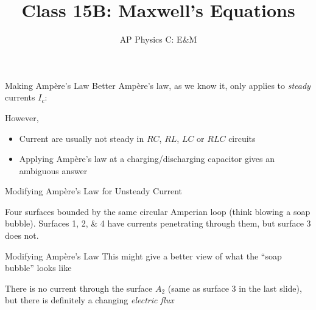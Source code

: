 \documentclass[12pt,aspectratio=169]{beamer}
\title{Class 15B: Maxwell's Equations}
\subtitle{AP Physics C: E\&M}
\begin{document}
\begin{frame}
  \maketitle
\end{frame}



\begin{frame}{Making Amp\`{e}re's Law Better}
  Amp\`{e}re's law, as we know it, only applies to \emph{steady} currents $I_c$:

  However,
  \begin{itemize}
  \item Current are usually not steady in $RC$, $RL$, $LC$ or $RLC$ circuits
  \item Applying Amp\`{e}re's law at a charging/discharging capacitor gives an
    ambiguous answer
  \end{itemize}
\end{frame}



\begin{frame}{Modifying Amp\`{e}re's Law for Unsteady Current}
  \begin{center}
  \end{center}
  Four surfaces bounded by the same circular Amperian loop
  (think blowing a soap bubble). Surfaces \numlist{1;2;4} have currents
  penetrating through them, but surface 3 does not.
\end{frame}



\begin{frame}{Modifying Amp\`{e}re's Law}
  This might give a better view of what the ``soap bubble'' looks like
  \begin{center}
  \end{center}
  There is no current through the surface $A_2$ (same as surface \num{3} in the
  last slide), but there is definitely a changing \emph{electric flux}
\end{frame}
\end{document}
